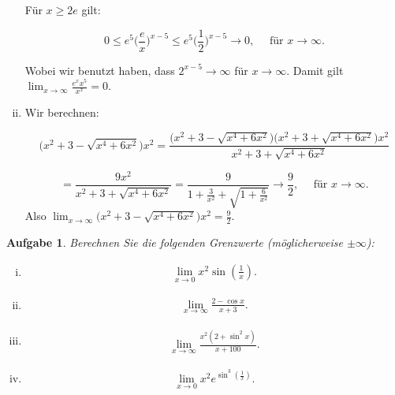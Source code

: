\documentclass[a4paper, 20]{exam}
\newtheorem{ex}{Aufgabe}
\begin{document}
\begin{solution}
\begin{enumerate}[i)]
F\"ur $x\geq 2e$ gilt:

$$0 \leq e^5  \bigg(\frac{e}{x}\bigg)^{x-5} \leq e^5 \bigg(\frac{1}{2}\bigg)^{x-5} \longrightarrow 0,
\quad \text{ f\"ur } x\longrightarrow \infty.$$

Wobei wir benutzt haben, dass $2^{x-5} \longrightarrow \infty$ f\"ur $x\longrightarrow \infty$. Damit gilt $\lim_{x\rightarrow \infty} \frac{e^x x^5}{x^x}= 0$.

\item
Wir berechnen:

$$\big(x^2 + 3 - \sqrt{x^4 + 6x^2}\big)x^2 
= \frac{\big(x^2 + 3 - \sqrt{x^4 + 6x^2}\big)\big(x^2 + 3 + \sqrt{x^4 + 6x^2}\big)x^2}{x^2 + 3 + \sqrt{x^4 + 6x^2}}$$

$$ = \frac{9x^2}{x^2 + 3 + \sqrt{x^4 + 6x^2}} 
= \frac{9}{1 + \frac{3}{x^2} + \sqrt{1 + \frac{6}{x^2}}} \longrightarrow \frac{9}{2}, \quad \text{ f\"ur } x \longrightarrow \infty.$$
Also $\lim_{x\rightarrow \infty} \big(x^2 + 3 - \sqrt{x^4 + 6x^2}\big)x^2 = \frac{9}{2}$.

\end{enumerate}
\end{solution}

 

\begin{ex} Berechnen Sie die folgenden Grenzwerte (möglicherweise $\pm \infty$):
\begin{enumerate}[i)]
\item  \begin{align*}
\lim_{x \rightarrow 0 } x^2 \sin \left( \frac{1}{x} \right) .
\end{align*}
\item \begin{align*}
\lim_{x \rightarrow \infty} \frac{2- \cos x}{x+3}.
\end{align*}
\item \begin{align*}
\lim_{x \rightarrow \infty} \frac{x^2 (2+ \sin^2x)}{x+100}.
\end{align*}
\item \begin{align*}
\lim_{x \rightarrow 0 } x^2 e^{ \sin^3 \left( \frac{1}{x}\right) } .
\end{align*}
\end{enumerate}
\end{ex}
\end{document}
